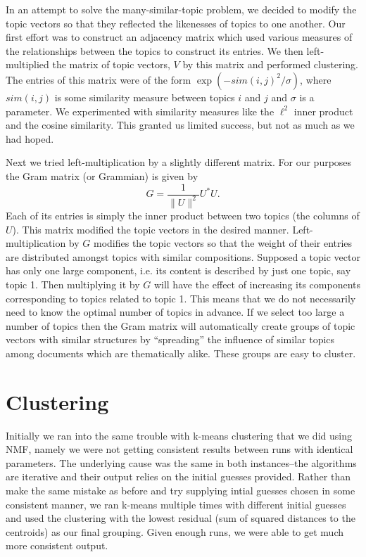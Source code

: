 \documentclass[fleqn,10pt]{../SelfArx} %
\begin{document}
In an attempt to solve the many-similar-topic problem, we decided to modify the topic vectors so that they reflected the likenesses of topics to one another. Our first effort was to construct an adjacency matrix which used various measures of the relationships between the topics to construct its entries. We then left-multiplied the matrix of topic vectors, $V$ by this matrix and performed clustering. The entries of this matrix were of the form $\exp(-sim(i,j)^2/\sigma)$, where $sim(i,j)$ is some similarity measure between topics $i$ and $j$ and $\sigma$ is a parameter. We experimented with similarity measures like the $\ell^2$ inner product and the cosine similarity. This granted us limited success, but not as much as we had hoped.

Next we tried left-multiplication by a slightly different matrix. For our purposes the Gram matrix (or Grammian) is given by 
\[
G = \frac{1}{\|U\|^2}U^*U.
\]
Each of its entries is simply the inner product between two topics (the columns of $U$). This matrix modified the topic vectors in the desired manner. Left-multiplication by $G$ modifies the topic vectors so that the weight of their entries are distributed amongst topics with similar compositions. Supposed a topic vector has only one large component, i.e. its content is described by just one topic, say topic 1. Then multiplying it by $G$ will have the effect of increasing its components corresponding to topics related to topic 1. This means that we do not necessarily need to know the optimal number of topics in advance. If we select too large a number of topics then the Gram matrix will automatically create groups of topic vectors with similar structures by ``spreading'' the influence of similar topics among documents which are thematically alike. These groups are easy to cluster.



\section{Clustering} %
\label{sec:clustering}
Initially we ran into the same trouble with k-means clustering that we did using NMF, namely we were not getting consistent results between runs with identical parameters. The underlying cause was the same in both instances--the algorithms are iterative and their output relies on the initial guesses provided. Rather than make the same mistake as before and try supplying intial guesses chosen in some consistent manner, we ran k-means multiple times with different initial guesses and used the clustering with the lowest residual (sum of squared distances to the centroids) as our final grouping. Given enough runs, we were able to get much more consistent output.
\end{document}
